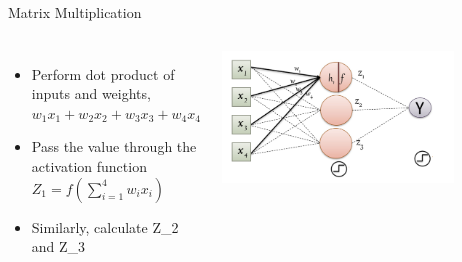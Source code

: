 \documentclass[aspectratio=169,13pt,usenames,dvipsnames]{beamer}
\begin{document}
\begin{frame}{ Matrix Multiplication }
\begin{columns}
\begin{itemize}
  \item Perform dot product of inputs and weights, \\
  $w_{1}x_{1} + w_{2}x_{2} + w_{3}x_{3} + w_{4}x_{4}$ \\
  \item Pass the value through the activation function \\
  $Z_{1} = f\left ( \sum_{i=1}^{4} w_{i}x_{i}\right )$ \\
  \item Similarly, calculate Z\_{2} and Z\_{3}
\end{itemize}
\includegraphics[width=0.8\textwidth, height=0.6\textheight]{Images/AIML_MLP_IMG5.jpg}
\end{columns}
\end{frame}
\end{document}
